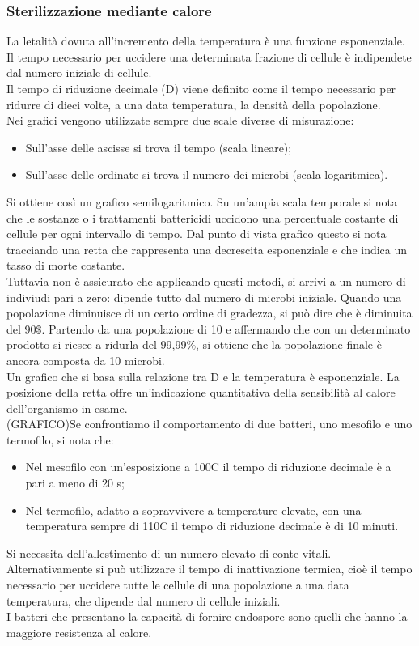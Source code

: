\subsubsection{Sterilizzazione mediante calore}
La letalità dovuta all'incremento della temperatura è una funzione esponenziale. Il tempo necessario per uccidere una determinata frazione di cellule è indipendete dal numero iniziale di cellule. 
\\Il tempo di riduzione decimale (D) viene definito come il tempo necessario per ridurre di dieci volte, a una data temperatura, la densità della popolazione. 
\\Nei grafici vengono utilizzate sempre due scale diverse di misurazione:
\begin{itemize}
    \item Sull'asse delle ascisse si trova il tempo (scala lineare); 
    \item Sull'asse delle ordinate si trova il numero dei microbi (scala logaritmica).
\end{itemize}
Si ottiene così un grafico semilogaritmico. 
Su un'ampia scala temporale si nota che le sostanze o i trattamenti battericidi uccidono una percentuale costante di cellule per ogni intervallo di tempo. Dal punto di vista grafico questo si nota tracciando una retta che rappresenta una decrescita esponenziale e che indica un tasso di morte costante.
\\Tuttavia non è assicurato che applicando questi metodi, si arrivi a un numero di indiviudi pari a zero: dipende tutto dal numero di microbi iniziale. Quando una popolazione diminuisce di un certo ordine di gradezza, si può dire che è diminuita del 90$\$$. Partendo da una popolazione di 10 e affermando che con un determinato prodotto si riesce a ridurla del 99,99$\%$, si ottiene che la popolazione finale è ancora composta da 10 microbi. 
\\Un grafico che si basa sulla relazione tra D e la temperatura è esponenziale. La posizione della retta offre un'indicazione quantitativa della sensibilità al calore dell'organismo in esame. 
\\(GRAFICO)Se confrontiamo il comportamento di due batteri, uno mesofilo e uno termofilo, si nota che:
\begin{itemize}
    \item Nel mesofilo con un'esposizione a 100C il tempo di riduzione decimale è a pari a meno di 20 s; 
    \item Nel termofilo, adatto a sopravvivere a temperature elevate, con una temperatura sempre di 110C il tempo di riduzione decimale è di 10 minuti. 
\end{itemize}
Si necessita dell'allestimento di un numero elevato di conte vitali. 
\\Alternativamente si può utilizzare il tempo di inattivazione termica, cioè il tempo necessario per uccidere tutte le cellule di una popolazione a una data temperatura, che dipende dal numero di cellule iniziali. 
\\I batteri che presentano la capacità di fornire endospore sono quelli che hanno la maggiore resistenza al calore. 
